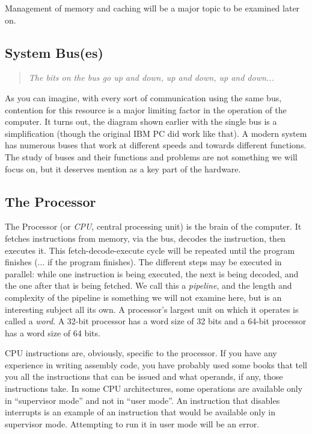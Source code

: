 Management of memory and caching will be a major topic to be examined later on.

\subsection*{System Bus(es)}
\begin{quote}
	\textit{The bits on the bus go up and down, up and down, up and down...}
\end{quote}

As you can imagine, with every sort of communication using the same bus, contention for this resource is a major limiting factor in the operation of the computer. It turns out, the diagram shown earlier with the single bus is a simplification (though the original IBM PC did work like that). A modern system has numerous buses that work at different speeds and towards different functions. The study of buses and their functions and problems are not something we will focus on, but it deserves mention as a key part of the hardware.

\subsection*{The Processor}

The Processor (or \textit{CPU}, central processing unit) is the brain of the computer. It fetches instructions from memory, via the bus, decodes the instruction, then executes it. This fetch-decode-execute cycle will be repeated until the program finishes (... if the program finishes). The different steps may be executed in parallel: while one instruction is being executed, the next is being decoded, and the one after that is being fetched. We call this a \textit{pipeline}, and the length and complexity of the pipeline is something we will not examine here, but is an interesting subject all its own. A processor's largest unit on which it operates is called a \textit{word}. A 32-bit processor has a word size of 32 bits and a 64-bit processor has a word size of 64 bits.

CPU instructions are, obviously, specific to the processor. If you have any experience in writing assembly code, you have probably used some books that tell you all the instructions that can be issued and what operands, if any, those instructions take. In some CPU architectures, some operations are available only in ``supervisor mode'' and not in ``user mode''. An instruction that disables interrupts is an example of an instruction that would be available only in supervisor mode. Attempting to run it in user mode will be an error.

